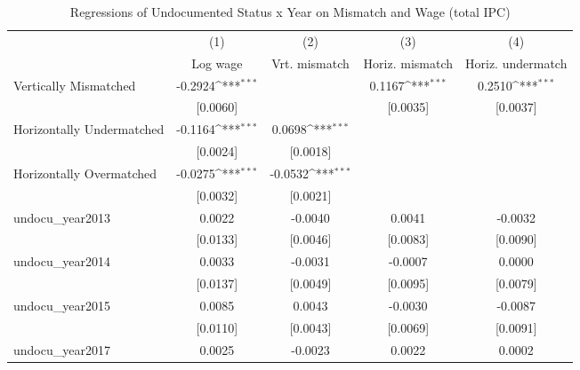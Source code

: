 \begin{table}[htbp]\centering
\def\sym#1{\ifmmode^{#1}\else\(^{#1}\)\fi}
\caption{Regressions of Undocumented Status x Year on Mismatch and Wage (total IPC)}
\begin{tabular}{l*{4}{c}}
\toprule
                    &\multicolumn{1}{c}{(1)}         &\multicolumn{1}{c}{(2)}         &\multicolumn{1}{c}{(3)}         &\multicolumn{1}{c}{(4)}         \\
                    &    Log wage         &Vrt. mismatch         &Horiz. mismatch         &Horiz. undermatch         \\
\midrule
Vertically Mismatched&     -0.2924\sym{***}&                     &      0.1167\sym{***}&      0.2510\sym{***}\\
                    &    [0.0060]         &                     &    [0.0035]         &    [0.0037]         \\
\addlinespace
Horizontally Undermatched&     -0.1164\sym{***}&      0.0698\sym{***}&                     &                     \\
                    &    [0.0024]         &    [0.0018]         &                     &                     \\
\addlinespace
Horizontally Overmatched&     -0.0275\sym{***}&     -0.0532\sym{***}&                     &                     \\
                    &    [0.0032]         &    [0.0021]         &                     &                     \\
\addlinespace
undocu\_year2013     &      0.0022         &     -0.0040         &      0.0041         &     -0.0032         \\
                    &    [0.0133]         &    [0.0046]         &    [0.0083]         &    [0.0090]         \\
\addlinespace
undocu\_year2014     &      0.0033         &     -0.0031         &     -0.0007         &      0.0000         \\
                    &    [0.0137]         &    [0.0049]         &    [0.0095]         &    [0.0079]         \\
\addlinespace
undocu\_year2015     &      0.0085         &      0.0043         &     -0.0030         &     -0.0087         \\
                    &    [0.0110]         &    [0.0043]         &    [0.0069]         &    [0.0091]         \\
\addlinespace
undocu\_year2017     &      0.0025         &     -0.0023         &      0.0022         &      0.0002         \\

\end{tabular}
\end{table}
